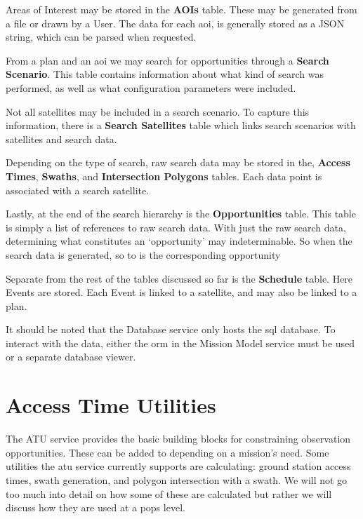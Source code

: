 Areas of Interest may be stored in the \textbf{AOIs} table. These may be
generated from a file or drawn by a User. The data for each \gls{aoi}, is
generally stored as a JSON string, which can be parsed when requested.

From a plan and an \gls{aoi} we may search for opportunities through a
\textbf{Search Scenario}.  This table contains information about what kind of
search was performed, as well as what configuration parameters were included.

Not all satellites may be included in a search scenario. To capture this
information, there is a \textbf{Search Satellites} table which links search
scenarios with satellites and search data.

Depending on the type of search, raw search data may be stored in the,
\textbf{Access Times}, \textbf{Swaths}, and \textbf{Intersection Polygons}
tables. Each data point is associated with a search satellite. 

Lastly, at the end of the search hierarchy is the \textbf{Opportunities} table.
This table is simply a list of references to raw search data. With just the raw
search data, determining what constitutes an `opportunity' may indeterminable.
So when the search data is generated, so to is the corresponding opportunity

Separate from the rest of the tables discussed so far is the \textbf{Schedule}
table. Here Events are stored. Each Event is linked to a satellite, and may
also be linked to a plan.

It should be noted that the Database service only hosts the \gls{sql} database.
To interact with the data, either the \acrshort{orm} in the Mission Model
service must be used or a separate database viewer.




\section{Access Time Utilities}\label{sec:atu}

The ATU service provides the basic building blocks for
constraining observation opportunities. These can be added to depending on a
mission’s need. Some utilities the \gls{atu} service currently supports are
calculating: ground station access times, swath generation, and polygon
intersection with a swath. We will not go too much into detail on how some of
these are calculated but rather we will discuss how they are used at a
\gls{pops} level.

